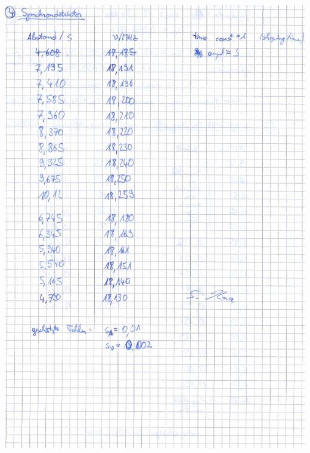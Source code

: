 \begin{appendix}
\centering \includegraphics[width = \textwidth]{appendix/scan0004.jpg}

\end{appendix}
